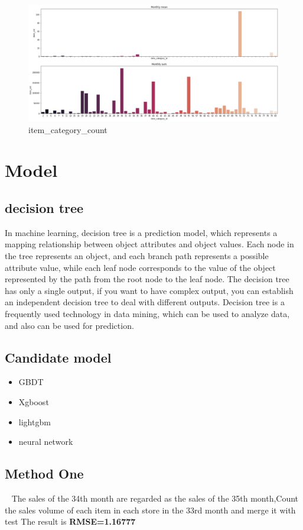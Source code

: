    \begin{figure}
        \includegraphics[scale=0.3]{picture/data_31.eps}
        \caption{item_category_count}\label{fig:3}
    \end{figure}
\section{Model}
\subsection{decision tree}\par
In machine learning, decision tree is a prediction model, which represents a mapping relationship between object attributes and object values. Each node in the tree represents an object, and each branch path represents a possible attribute value, while each leaf node corresponds to the value of the object represented by the path from the root node to the leaf node. The decision tree has only a single output, if you want to have complex output, you can establish an independent decision tree to deal with different outputs. Decision tree is a frequently used technology in data mining, which can be used to analyze data, and also can be used for prediction.
\subsection{Candidate model}\par
\begin{itemize}
    \item GBDT
    \item Xgboost
    \item lightgbm
    \item neural network
\end{itemize}
\subsection{Method One}\par
\ 
\newline
The sales of the 34th month are regarded as the sales of the 35th month,Count the sales volume of each item in each store in the 33rd month and merge it with test
The result is \textbf{RMSE=1.16777}

